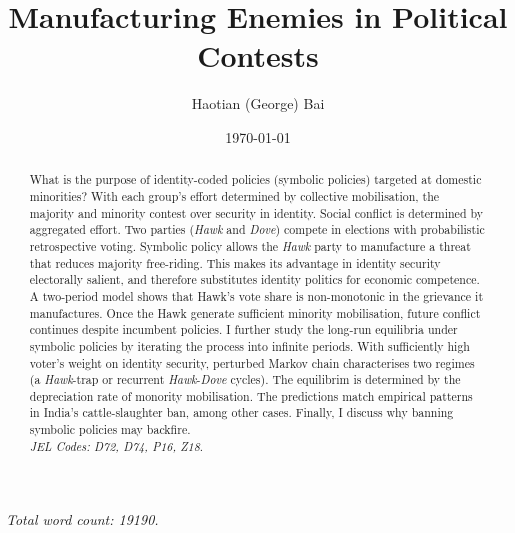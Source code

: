 \documentclass[11pt,twoside]{extarticle}
\title{Manufacturing Enemies in Political Contests}
\author{Haotian (George) Bai}
\date{\today}
\begin{document}
\maketitle

\begin{abstract}
What is the purpose of identity-coded policies (symbolic policies) targeted at domestic minorities? 
With each group's effort determined by collective mobilisation, the majority and minority contest over security in identity.
Social conflict is determined by aggregated effort.
Two parties (\emph{Hawk} and \emph{Dove}) compete in elections with probabilistic retrospective voting.
Symbolic policy allows the \emph{Hawk} party to manufacture a threat that reduces majority free-riding.
This makes its advantage in identity security electorally salient, and therefore substitutes identity politics for economic competence.
A two-period model shows that Hawk's vote share is non-monotonic in the grievance it manufactures.
Once the Hawk generate sufficient minority mobilisation, future conflict continues despite incumbent policies.
I further study the long-run equilibria under symbolic policies by iterating the process into infinite periods.
With sufficiently high voter's weight on identity security, perturbed Markov chain characterises two regimes (a \emph{Hawk}-trap or recurrent \emph{Hawk}-\emph{Dove} cycles). 
The equilibrim is determined by the depreciation rate of monority mobilisation.
The predictions match empirical patterns in India's cattle-slaughter ban, among other cases.
Finally, I discuss why banning symbolic policies may backfire.\\

\emph{JEL Codes: D72, D74, P16, Z18}.

\end{abstract}

\begin{center}
\small\textit{Total word count: 19190.}
\end{center}
\end{document}
